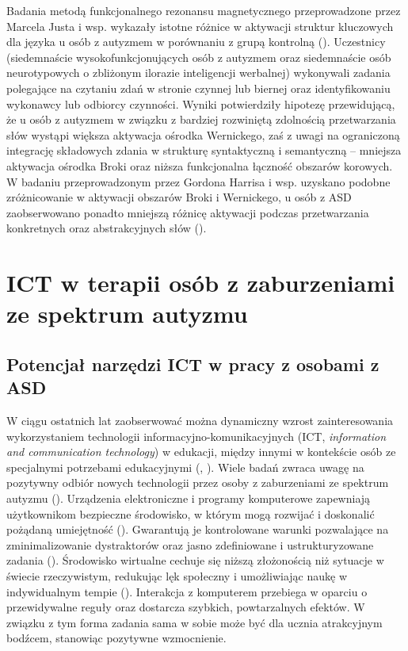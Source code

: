     
    Badania metodą funkcjonalnego rezonansu magnetycznego przeprowadzone przez Marcela Justa i wsp. wykazały istotne różnice w aktywacji struktur kluczowych dla języka u osób z autyzmem w porównaniu z grupą kontrolną (\cite{just2004cortical}).
    Uczestnicy (siedemnaście wysokofunkcjonujących osób z autyzmem oraz siedemnaście osób neurotypowych o zbliżonym ilorazie inteligencji werbalnej) wykonywali zadania polegające na czytaniu zdań w stronie czynnej lub biernej oraz identyfikowaniu wykonawcy lub odbiorcy czynności.
    Wyniki potwierdziły hipotezę przewidującą, że u osób z autyzmem w związku z bardziej rozwiniętą zdolnością przetwarzania słów wystąpi większa aktywacja ośrodka Wernickego, zaś z uwagi na ograniczoną integrację składowych zdania w strukturę syntaktyczną i semantyczną -- mniejsza aktywacja ośrodka Broki oraz niższa funkcjonalna łączność obszarów korowych.
    W badaniu przeprowadzonym przez Gordona Harrisa i wsp. uzyskano podobne zróżnicowanie w aktywacji obszarów Broki i Wernickego, u osób z ASD zaobserwowano ponadto mniejszą różnicę aktywacji podczas przetwarzania konkretnych oraz abstrakcyjnych słów (\cite{harris2006brain}).

\section{ICT w terapii osób z zaburzeniami ze spektrum autyzmu}

    \subsection{Potencjał narzędzi ICT w pracy z osobami z ASD}
    W ciągu ostatnich lat zaobserwować można dynamiczny wzrost zainteresowania wykorzystaniem technologii informacyjno-komunikacyjnych (ICT, \emph{information and communication technology}) w edukacji, między innymi w kontekście osób ze specjalnymi potrzebami edukacyjnymi (\cite{konstantinidis2009information}, \cite{grynszpan2014innovative}).
    Wiele badań zwraca uwagę na pozytywny odbiór nowych technologii przez osoby z zaburzeniami ze spektrum autyzmu (\cite{goldsmith2004use}).
    Urządzenia elektroniczne i programy komputerowe zapewniają użytkownikom bezpieczne środowisko, w którym mogą rozwijać i doskonalić pożądaną umiejętność (\cite{grynszpan2014innovative}).
    Gwarantują je kontrolowane warunki pozwalające na zminimalizowanie dystraktorów oraz jasno zdefiniowane i ustrukturyzowane zadania (\cite{ramdoss2011use}).
    Środowisko wirtualne cechuje się niższą złożonością niż sytuacje w świecie rzeczywistym, redukując lęk społeczny i umożliwiając naukę w indywidualnym tempie (\cite{putnam2008software}).
    Interakcja z komputerem przebiega w oparciu o przewidywalne reguły oraz dostarcza szybkich, powtarzalnych efektów.
    W związku z tym forma zadania sama w sobie może być dla ucznia atrakcyjnym bodźcem, stanowiąc pozytywne wzmocnienie.
    

